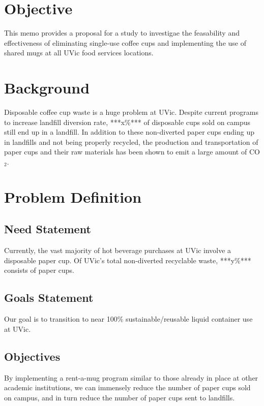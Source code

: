 \documentclass[letterpaper,11pt]{texMemo}
\begin{document}
\maketitle

\section*{Objective}
This memo provides a proposal for a study to investigae the feasability and
effectiveness of eliminating single-use coffee cups and implementing the
use of shared mugs at all UVic food services
locations.
\section*{Background}
Disposable coffee cup waste is a huge problem at UVic. Despite current programs
to increase landfill diversion rate, ***x\%*** of disposable cups sold on campus
still end up in a landfill.\cite{myrefitem} In addition to these non-diverted
paper cups ending up in landfills and not being properly recycled, the
production and transportation of paper cups and their raw materials has been
shown to emit a large amount of CO$_{2}$.\cite{papercupemissions}
\section*{Problem Definition}
\subsection*{Need Statement}
Currently, the vast majority of hot beverage purchases at UVic involve a
disposable paper cup.%
Of UVic's total non-diverted recyclable waste, ***y\%*** consists of paper
cups. %
\subsection*{Goals Statement}
Our goal is to transition to near 100\% sustainable/reusable liquid container
use at UVic.
\subsection*{Objectives}
By implementing a rent-a-mug program similar to those already in place at
other academic institutions,%
we can immensely reduce the number of paper cups sold on campus, and in
turn reduce the number of paper cups sent to landfills.
\end{document}
